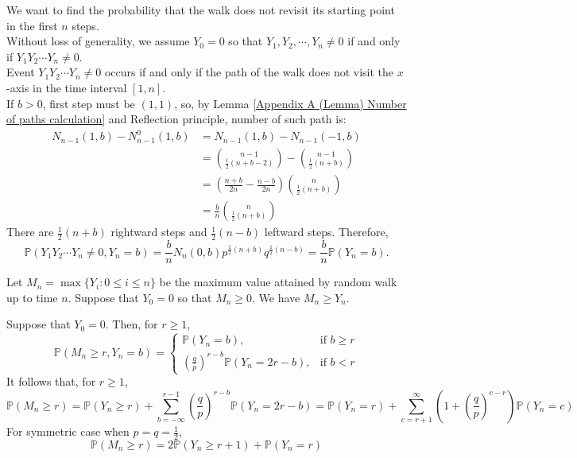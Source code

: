 \documentclass{huhtakm-template-book}
\newcommand{\prob}{\mathbb{P}}
\begin{document}
\begin{eg}
	We want to find the probability that the walk does not revisit its starting point in the first $n$ steps.\\
	Without loss of generality, we assume $Y_{0}=0$ so that $Y_{1},Y_{2},\cdots,Y_{n}\neq 0$ if and only if $Y_{1}Y_{2}\cdots Y_{n}\neq 0$.\\
	Event $Y_{1}Y_{2}\cdots Y_{n}\neq 0$ occurs if and only if the path of the walk does not visit the $x$-axis in the time interval $[1,n]$.\\
	If $b>0$, first step must be $(1,1)$, so, by Lemma \ref{Appendix A (Lemma) Number of paths calculation} and Reflection principle, number of such path is:
	\begin{align*}
		N_{n-1}(1,b)-N_{n-1}^{0}(1,b)&=N_{n-1}(1,b)-N_{n-1}(-1,b)\\
		&=\binom{n-1}{\frac{1}{2}(n+b-2)}-\binom{n-1}{\frac{1}{2}(n+b)}\\
		&=\left(\frac{n+b}{2n}-\frac{n-b}{2n}\right)\binom{n}{\frac{1}{2}(n+b)}\\
		&=\frac{b}{n}\binom{n}{\frac{1}{2}(n+b)}
	\end{align*}
	There are $\frac{1}{2}(n+b)$ rightward steps and $\frac{1}{2}(n-b)$ leftward steps. Therefore,
	\begin{equation*}
		\prob(Y_{1}Y_{2}\cdots Y_{n}\neq 0,Y_{n}=b)=\frac{b}{n}N_{n}(0,b)p^{\frac{1}{2}(n+b)}q^{\frac{1}{2}(n-b)}=\frac{b}{n}\prob(Y_{n}=b).
	\end{equation*}
\end{eg}
\begin{eg}
	Let $M_{n}=\max\{Y_{i}:0\leq i\leq n\}$ be the maximum value attained by random walk up to time $n$. Suppose that $Y_{0}=0$ so that $M_{n}\geq 0$. We have $M_{n}\geq Y_{n}$.
\end{eg}
\begin{thm}
	Suppose that $Y_{0}=0$. Then, for $r\geq 1$,
	\begin{equation*}
		\prob(M_{n}\geq r,Y_{n}=b)=\begin{cases}
			\prob(Y_{n}=b), &\text{if }b\geq r\\
			\left(\frac{q}{p}\right)^{r-b}\prob(Y_{n}=2r-b), &\text{if }b<r
		\end{cases}
	\end{equation*}
	It follows that, for $r\geq 1$,
	\begin{equation*}
		\prob(M_{n}\geq r)=\prob(Y_{n}\geq r)+\sum_{b=-\infty}^{r-1}\left(\frac{q}{p}\right)^{r-b}\prob(Y_{n}=2r-b)=\prob(Y_{n}=r)+\sum_{c=r+1}^{\infty}\left(1+\left(\frac{q}{p}\right)^{c-r}\right)\prob(Y_{n}=c)
	\end{equation*}
	For symmetric case when $p=q=\frac{1}{2}$,
	\begin{equation*}
		\prob(M_{n}\geq r)=2\prob(Y_{n}\geq r+1)+\prob(Y_{n}=r)
	\end{equation*}
\end{thm}
\end{document}

